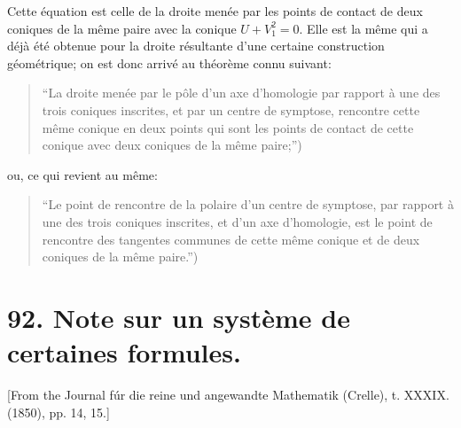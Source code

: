 \documentclass[12pt,a4paper]{article}
\theoremstyle{definition}
\begin{document}
Cette \'{e}quation est celle de la droite men\'{e}e par les points de contact de deux coniques de la m\^{e}me paire avec la conique $U + V_1^2 = 0$. Elle est la m\^{e}me qui a d\'{e}j\`{a} \'{e}t\'{e} obtenue pour la droite r\'{e}sultante d'une certaine construction g\'{e}om\'{e}trique; on est donc arriv\'{e} au th\'{e}or\`{e}me connu suivant:

\begin{quote}
``La droite men\'{e}e par le p\^{o}le d'un axe d'homologie par rapport \`{a} une des trois coniques inscrites, et par un centre de symptose, rencontre cette m\^{e}me conique en deux points qui sont les points de contact de cette conique avec deux coniques de la m\^{e}me paire;'')
\end{quote}
ou, ce qui revient au m\^{e}me:
\begin{quote}
``Le point de rencontre de la polaire d'un centre de symptose, par rapport \`{a} une des trois coniques inscrites, et d'un axe d'homologie, est le point de rencontre des tangentes communes de cette m\^{e}me conique et de deux coniques de la m\^{e}me paire.'')
\end{quote}

\newpage

\section*{92. Note sur un syst\`{e}me de certaines formules.}

[From the Journal f\'{u}r die reine und angewandte Mathematik (Crelle), t. XXXIX. (1850), pp. 14, 15.]
\end{document}
